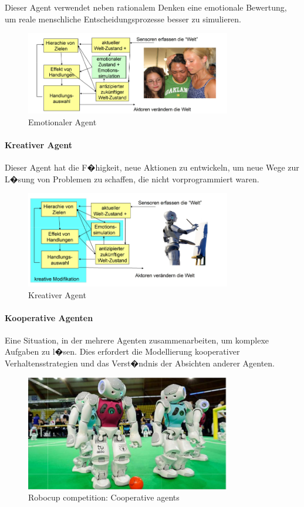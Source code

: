 Dieser Agent verwendet neben rationalem Denken eine emotionale Bewertung, um reale menschliche Entscheidungsprozesse besser zu simulieren.

\begin{figure}[H]
    \centering
    \includegraphics[width=0.8\textwidth]{figures/emotionaler-agent.png}
    \caption{Emotionaler Agent}
    \label{fig:emo-agent}
\end{figure}

\paragraph{Kreativer Agent}

Dieser Agent hat die F�higkeit, neue Aktionen zu entwickeln, um neue Wege zur L�sung von Problemen zu schaffen, die nicht vorprogrammiert waren.

\begin{figure}[H]
    \centering
    \includegraphics[width=0.8\textwidth]{figures/creative-agent.png}
    \caption{Kreativer Agent}
    \label{fig:creative-agent}
\end{figure}


\paragraph{Kooperative Agenten}

Eine Situation, in der mehrere Agenten zusammenarbeiten, um komplexe Aufgaben zu l�sen. Dies erfordert die Modellierung kooperativer Verhaltensstrategien und das Verst�ndnis der Absichten anderer Agenten.

\begin{figure}[H]
    \centering
    \includegraphics[width=0.8\textwidth]{figures/robocup.png}
    \caption{Robocup competition: Cooperative agents}
    \label{fig:coop-agent}
\end{figure}
